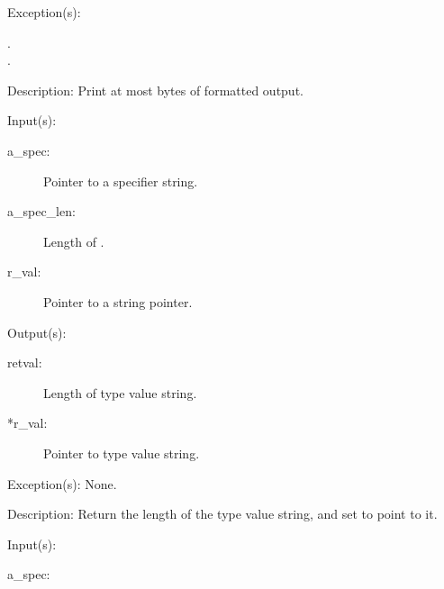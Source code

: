 \begin{capi}
\begin{capilist}
\begin{description}
		\end{description}
	\item[Exception(s): ]
		\begin{description}\item[]
		\item[.]
		\item[.]
		\end{description}
	\item[Description: ]
		Print at most  bytes of formatted output.
	\end{capilist}
\label{spec_type_get}
	\begin{capilist}
	\item[Input(s): ]
		\begin{description}\item[]
		\item[a\_spec: ]
			Pointer to a specifier string.
		\item[a\_spec\_len: ]
			Length of .
		\item[r\_val: ]
			Pointer to a string pointer.
		\end{description}
	\item[Output(s): ]
		\begin{description}\item[]
		\item[retval: ]
			Length of type value string.
		\item[*r\_val: ]
			Pointer to type value string.
		\end{description}
	\item[Exception(s): ] None.
	\item[Description: ]
		Return the length of the type value string, and set
		 to point to it.
	\end{capilist}
\label{spec_val_get}
	\begin{capilist}
	\item[Input(s): ]
		\begin{description}\item[]
		\item[a\_spec: ]

\end{description}
\end{capilist}
\end{capi}
